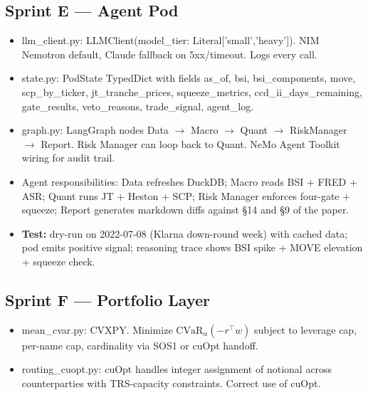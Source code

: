 \documentclass[11pt]{article}
\newcommand{\inlinecode}[1]{{\ttfamily\small #1}}
\begin{document}
\subsection{Sprint E --- Agent Pod}
\begin{itemize}
  \item \inlinecode{llm\_client.py}: \inlinecode{LLMClient(model\_tier: Literal['small','heavy'])}. NIM Nemotron default, Claude fallback on 5xx/timeout. Logs every call.
  \item \inlinecode{state.py}: \inlinecode{PodState} TypedDict with fields \inlinecode{as\_of}, \inlinecode{bsi}, \inlinecode{bsi\_components}, \inlinecode{move}, \inlinecode{scp\_by\_ticker}, \inlinecode{jt\_tranche\_prices}, \inlinecode{squeeze\_metrics}, \inlinecode{ccd\_ii\_days\_remaining}, \inlinecode{gate\_results}, \inlinecode{veto\_reasons}, \inlinecode{trade\_signal}, \inlinecode{agent\_log}.
  \item \inlinecode{graph.py}: LangGraph nodes Data $\to$ Macro $\to$ Quant $\to$ RiskManager $\to$ Report. Risk Manager can loop back to Quant. NeMo Agent Toolkit wiring for audit trail.
  \item Agent responsibilities: Data refreshes DuckDB; Macro reads BSI + FRED + ASR; Quant runs JT + Heston + SCP; Risk Manager enforces four-gate + squeeze; Report generates markdown diffs against \S14 and \S9 of the paper.
  \item \textbf{Test:} dry-run on 2022-07-08 (Klarna down-round week) with cached data; pod emits positive signal; reasoning trace shows BSI spike + MOVE elevation + squeeze check.
\end{itemize}

\subsection{Sprint F --- Portfolio Layer}
\begin{itemize}
  \item \inlinecode{mean\_cvar.py}: CVXPY. Minimize $\mathrm{CVaR}_{\alpha}(-r^\top w)$ subject to leverage cap, per-name cap, cardinality via SOS1 or cuOpt handoff.
  \item \inlinecode{routing\_cuopt.py}: cuOpt handles integer assignment of notional across counterparties with TRS-capacity constraints. Correct use of cuOpt.
\end{itemize}
\end{document}
